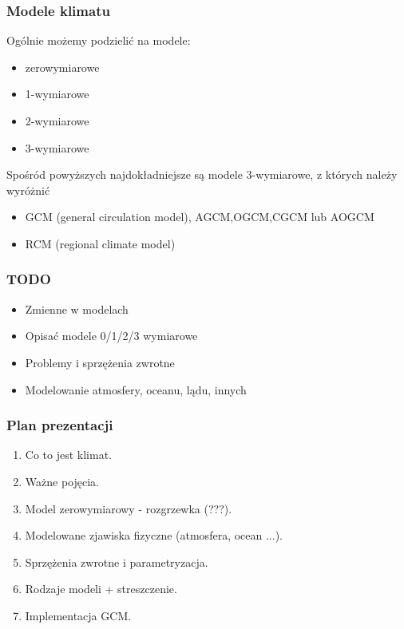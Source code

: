 \documentclass{beamer}
\begin{document}
\begin{frame}
	\frametitle{Modele klimatu}
	Ogólnie możemy podzielić na modele:
	\begin{itemize}
		\item zerowymiarowe
		\item 1-wymiarowe
		\item 2-wymiarowe
		\item 3-wymiarowe
	\end{itemize}
	\vspace{0.5cm}
	Spośród powyższych najdokładniejsze są modele 3-wymiarowe, z których należy wyróżnić
	\begin{itemize}
		\item GCM (general circulation model), AGCM,OGCM,CGCM lub AOGCM
		\item RCM (regional climate model)
	\end{itemize}

		

\end{frame}


\begin{frame}
	\frametitle{TODO}
	\begin{itemize}
		\item Zmienne w modelach
		\item Opisać modele 0/1/2/3 wymiarowe
		\item Problemy i sprzężenia zwrotne
		\item Modelowanie atmosfery, oceanu, lądu, innych
	\end{itemize}
\end{frame}


\begin{frame}
	\frametitle{Plan prezentacji}
	\begin{enumerate}
		\item Co to jest klimat.
		\item Ważne pojęcia.
		\item Model zerowymiarowy - rozgrzewka (???).
		\item Modelowane zjawiska fizyczne (atmosfera, ocean ...).
		\item Sprzężenia zwrotne i parametryzacja.
		\item Rodzaje modeli + streszczenie.
		\item Implementacja GCM.
	\end{enumerate}
\end{frame}
\end{document}
